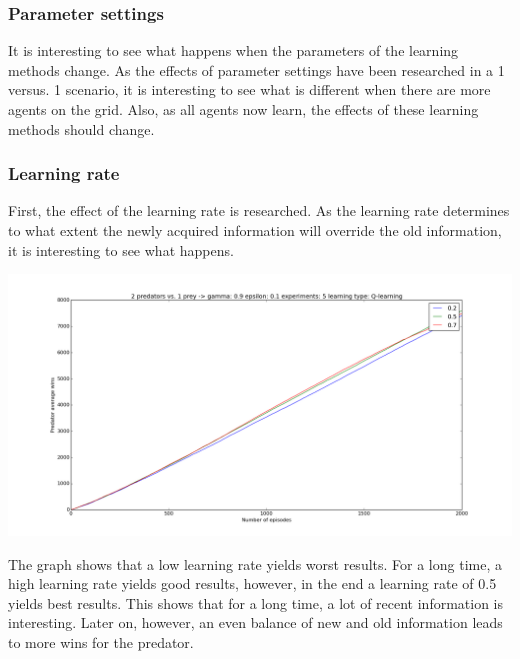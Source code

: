 \subsubsection{Parameter settings}
It is interesting to see what happens when the parameters of the learning methods change. As the effects of parameter settings have been researched in a 1 versus. 1 scenario, it is interesting to see what is different when there are more agents on the grid. Also, as all agents now learn, the effects of these learning methods should change.

\subsubsection{Learning rate}
First, the effect of the learning rate is researched. As the learning rate determines to what extent the newly acquired information will override the old information, it is interesting to see what happens. 

\begin{center}
	\includegraphics[scale=0.3]{2_predators_learning_rate_q_learning}
\end{center}

The graph shows that a low learning rate yields worst results. For a long time, a high learning rate yields good results, however, in the end a learning rate of 0.5 yields best results. This shows that for a long time, a lot of recent information is interesting.  Later on, however, an even balance of new and old information leads to more wins for the predator. 

